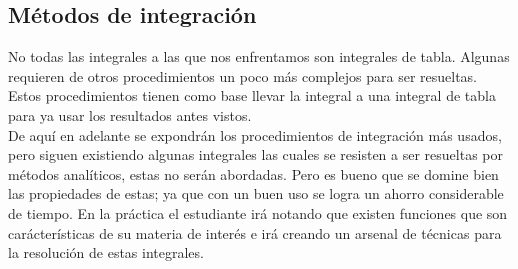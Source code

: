 \documentclass[10pt,twoside]{SelfArx} %
\begin{document}
\subsection{Métodos de integración}
No todas las integrales a las que nos enfrentamos son integrales de tabla. Algunas requieren de otros procedimientos un poco más complejos para ser resueltas. Estos procedimientos tienen como base llevar la integral a una integral de tabla para ya usar los resultados antes vistos. \\
De aquí en adelante se expondr\'an los procedimientos de integración más usados, pero siguen existiendo algunas integrales las cuales se resisten a ser resueltas por métodos analíticos, estas no serán abordadas. Pero es bueno que se domine bien las propiedades de estas; ya que con un buen uso se logra un ahorro considerable de tiempo. En la práctica  el estudiante irá notando que existen funciones que son carácterísticas de su materia de interés e irá creando un arsenal de técnicas para la resolución de estas integrales.





\end{document}
